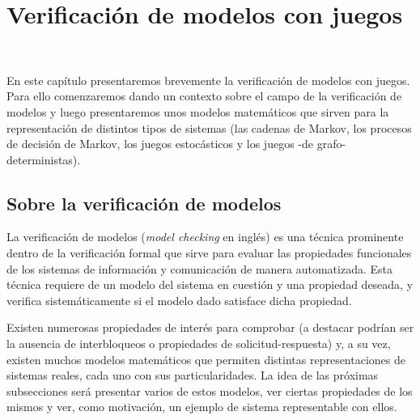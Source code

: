 \chapter{Verificación de modelos con juegos}
~\label{cap:modelos}
\vspace{-1cm}

En este capítulo presentaremos brevemente la verificación de modelos con
juegos. Para ello comenzaremos dando un contexto sobre el campo de la
verificación de modelos y luego presentaremos unos modelos matemáticos que
sirven para la representación de distintos tipos de sistemas (las cadenas de
Markov, los procesos de decisión de Markov, los juegos estocásticos y los
juegos -de grafo- deterministas).


\section{Sobre la verificación de modelos}

La verificación de modelos (\textit{model checking} en inglés) es una técnica
prominente dentro de la verificación formal que sirve para evaluar las
propiedades funcionales de los sistemas de información y comunicación de manera
automatizada. Esta técnica requiere de un modelo del sistema en cuestión y una
propiedad deseada, y verifica sistemáticamente si el modelo dado satisface
dicha propiedad.

Existen numerosas propiedades de interés para comprobar (a destacar podrían ser
la ausencia de interbloqueos o propiedades de solicitud-respuesta) y, a su vez,
existen muchos modelos matemáticos que permiten distintas representaciones de
sistemas reales, cada uno con sus particularidades. La idea de las próximas
subsecciones será presentar varios de estos modelos, ver ciertas propiedades de
los mismos y ver, como motivación, un ejemplo de sistema representable con
ellos.

